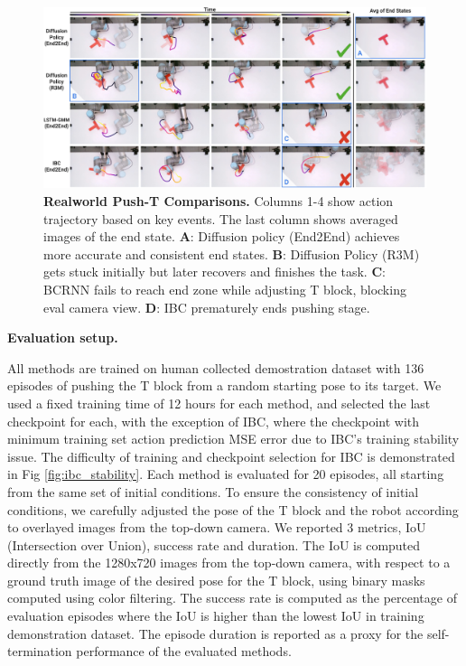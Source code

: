 \begin{figure}
\centering
\includegraphics[width=\linewidth]{figure/real_results.pdf}

\caption{\textbf{Realworld Push-T Comparisons.}
\label{fig:real_pusht_comparison}
Columns 1-4 show action trajectory based on key events. The last column shows averaged images of the end state.
\textbf{A}: Diffusion policy (End2End) achieves more accurate and consistent end states.
\textbf{B}: Diffusion Policy (R3M) gets stuck initially but later recovers and finishes the task.
\textbf{C}: BCRNN fails to reach end zone while adjusting T block, blocking eval camera view.
\textbf{D}: IBC prematurely ends pushing stage.
}

\end{figure}

\textbf{Evaluation setup.}




All methods are trained on human collected demostration dataset with 136 episodes of pushing the T block from a random starting pose to its target. We used a fixed training time of 12 hours for each method, and selected the last checkpoint for each, with the exception of IBC, where the checkpoint with minimum training set action prediction MSE error due to IBC's training stability issue. The difficulty of training and checkpoint selection for IBC is demonstrated in Fig \ref{fig:ibc_stability}. Each method is evaluated for 20 episodes, all starting from the same set of initial conditions. To ensure the consistency of initial conditions, we carefully adjusted the pose of the T block and the robot according to overlayed images from the top-down camera. We reported 3 metrics, IoU (Intersection over Union), success rate and duration. The IoU is computed directly from the 1280x720 images from the top-down camera, with respect to a ground truth image of the desired pose for the T block, using binary masks computed using color filtering. The success rate is computed as the percentage of evaluation episodes where the IoU is higher than the lowest IoU in training demonstration dataset.
The episode duration is reported as a proxy for the self-termination performance of the evaluated methods.

